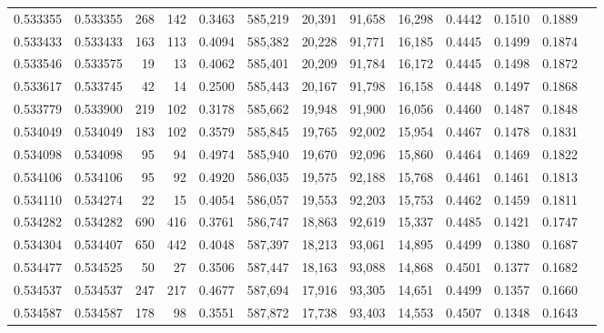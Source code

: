 \begin{tabular}{rrrrrrrrrrrrr}
0.533355 & 0.533355 &   268 &   142 &                                     0.3463 & 585,219 &  20,391 &  91,658 &  16,298 & 0.4442 & 0.1510 & 0.1889 \\
0.533433 & 0.533433 &   163 &   113 &                                     0.4094 & 585,382 &  20,228 &  91,771 &  16,185 & 0.4445 & 0.1499 & 0.1874 \\
0.533546 & 0.533575 &    19 &    13 &                                     0.4062 & 585,401 &  20,209 &  91,784 &  16,172 & 0.4445 & 0.1498 & 0.1872 \\
0.533617 & 0.533745 &    42 &    14 &                                     0.2500 & 585,443 &  20,167 &  91,798 &  16,158 & 0.4448 & 0.1497 & 0.1868 \\
0.533779 & 0.533900 &   219 &   102 &                                     0.3178 & 585,662 &  19,948 &  91,900 &  16,056 & 0.4460 & 0.1487 & 0.1848 \\
0.534049 & 0.534049 &   183 &   102 &                                     0.3579 & 585,845 &  19,765 &  92,002 &  15,954 & 0.4467 & 0.1478 & 0.1831 \\
0.534098 & 0.534098 &    95 &    94 &                                     0.4974 & 585,940 &  19,670 &  92,096 &  15,860 & 0.4464 & 0.1469 & 0.1822 \\
0.534106 & 0.534106 &    95 &    92 &                                     0.4920 & 586,035 &  19,575 &  92,188 &  15,768 & 0.4461 & 0.1461 & 0.1813 \\
0.534110 & 0.534274 &    22 &    15 &                                     0.4054 & 586,057 &  19,553 &  92,203 &  15,753 & 0.4462 & 0.1459 & 0.1811 \\
0.534282 & 0.534282 &   690 &   416 &                                     0.3761 & 586,747 &  18,863 &  92,619 &  15,337 & 0.4485 & 0.1421 & 0.1747 \\
0.534304 & 0.534407 &   650 &   442 &                                     0.4048 & 587,397 &  18,213 &  93,061 &  14,895 & 0.4499 & 0.1380 & 0.1687 \\
0.534477 & 0.534525 &    50 &    27 &                                     0.3506 & 587,447 &  18,163 &  93,088 &  14,868 & 0.4501 & 0.1377 & 0.1682 \\
0.534537 & 0.534537 &   247 &   217 &                                     0.4677 & 587,694 &  17,916 &  93,305 &  14,651 & 0.4499 & 0.1357 & 0.1660 \\
0.534587 & 0.534587 &   178 &    98 &                                     0.3551 & 587,872 &  17,738 &  93,403 &  14,553 & 0.4507 & 0.1348 & 0.1643 \\

\end{tabular}
